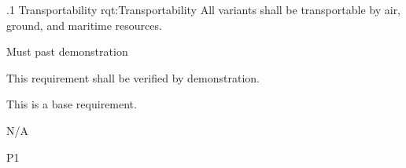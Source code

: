 \ONERQMTVKSA
{\RqtNumberBase.1}
{Transportability}
{rqt:Transportability}
{All \ThisSystem variants shall be transportable by air, ground, and maritime resources.}
{
	\item [Phase 1] Must past demonstration
}
{This requirement shall be verified by demonstration.}
{
\item [N/A] This is a base requirement.
}
{
	\item N/A
}
{P1}

